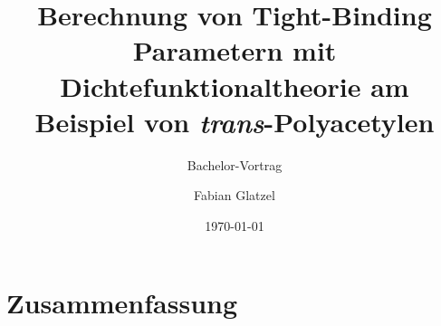 \documentclass[11pt]{beamer}
\author{Fabian Glatzel}
\title[Bachelor Vortrag]{Berechnung von Tight-Binding Parametern mit Dichtefunktionaltheorie am Beispiel von \emph{trans}-Polyacetylen}
\subtitle{Bachelor-Vortrag}
\date{\today}
\begin{document}
\begin{frame}[plain]
	\maketitle
\end{frame}

\begin{frame}
\tableofcontents
\end{frame}



\section{Zusammenfassung}

\end{document}
